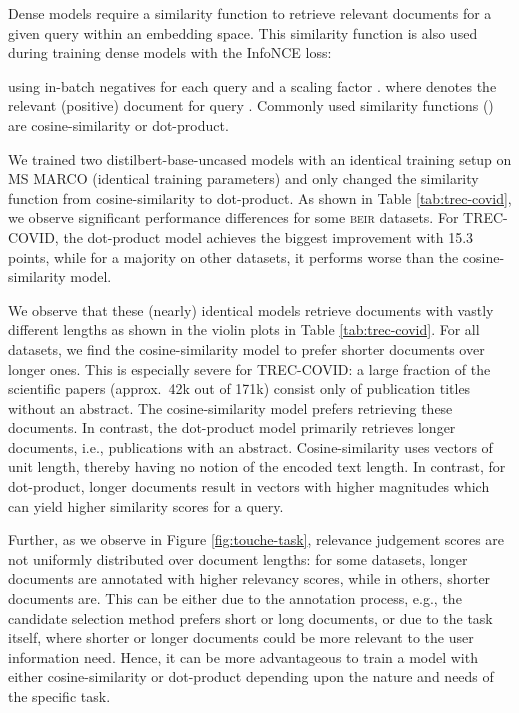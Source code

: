 \documentclass{article}
\newcommand{\custo}[1]{\textsc{\normalsize #1}}
\newcommand{\beir}{\custo{beir}\xspace}
\begin{document}
Dense models require a similarity function to retrieve relevant documents for a given query within an embedding space. This similarity function is also used during training dense models with the InfoNCE \cite{oord2019representation} loss:



using  in-batch negatives for each query  and a scaling factor . where  denotes the relevant (positive) document for query . Commonly used similarity functions () are cosine-similarity or dot-product. 

We trained two distilbert-base-uncased models with an identical training setup on MS MARCO (identical training parameters) and only changed the similarity function from cosine-similarity to dot-product. As shown in Table \ref{tab:trec-covid}, we observe significant performance differences for some \beir datasets. For TREC-COVID, the dot-product model achieves the biggest improvement with 15.3 points, while for a majority on other datasets, it performs worse than the cosine-similarity model.

We observe that these (nearly) identical models retrieve documents with vastly different lengths as shown in the violin plots in Table \ref{tab:trec-covid}. For all datasets, we find the cosine-similarity model to prefer shorter documents over longer ones. This is especially severe for TREC-COVID: a large fraction of the scientific papers (approx.~42k out of 171k) consist only of publication titles without an abstract. The cosine-similarity model prefers retrieving these documents. In contrast, the dot-product model primarily retrieves longer documents, i.e., publications with an abstract. Cosine-similarity uses vectors of unit length, thereby having no notion of the encoded text length. In contrast, for dot-product, longer documents result in vectors with higher magnitudes which can yield higher similarity scores for a query.

Further, as we observe in Figure \ref{fig:touche-task}, relevance judgement scores are not uniformly distributed over document lengths: for some datasets, longer documents are annotated with higher relevancy scores, while in others, shorter documents are. This can be either due to the annotation process, e.g., the candidate selection method prefers short or long documents, or due to the task itself, where shorter or longer documents could be more relevant to the user information need. Hence, it can be more advantageous to train a model with either cosine-similarity or dot-product depending upon the nature and needs of the specific task.
\end{document}
